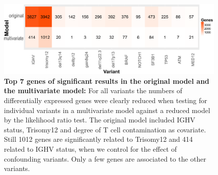 \FloatBarrier

\begin{figure}
	\centering
	\includegraphics[width=\columnwidth]{./Figures/comparisonModel.pdf}
	\caption{\textbf{Top 7 genes of significant results in the original model and the multivariate model:} For all variants the numbers of differentially expressed genes were clearly reduced when testing for individual variants in a multivariate model against a reduced model by the likelihood ratio test. The original model included IGHV status, Trisomy12 and degree of T cell contamination as covariate. Still 1012 genes are significantly related to Trisomy12 and 414 related to IGHV status, when we control for the effect of confounding variants. Only a few genes are associated to the other variants.}
	\label{fig:compModel}
\end{figure}




